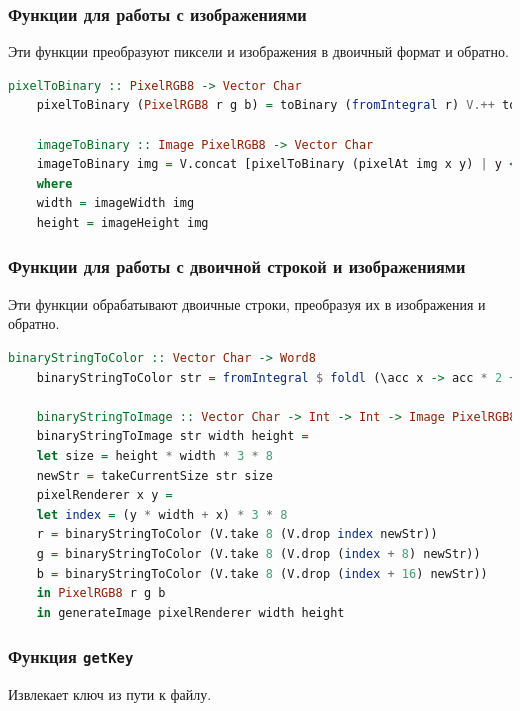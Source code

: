 \documentclass[10pt,a4paper,final]{article} %
\begin{document}
\subsubsection{Функции для работы с изображениями}

Эти функции преобразуют пиксели и изображения в двоичный формат и обратно.

\begin{lstlisting}[language=Haskell, caption=Функции для работы с изображениями]
	pixelToBinary :: PixelRGB8 -> Vector Char
	pixelToBinary (PixelRGB8 r g b) = toBinary (fromIntegral r) V.++ toBinary (fromIntegral g) V.++ toBinary (fromIntegral b) 
	
	imageToBinary :: Image PixelRGB8 -> Vector Char
	imageToBinary img = V.concat [pixelToBinary (pixelAt img x y) | y <- [0..height-1], x <- [0..width-1]]
	where 
	width = imageWidth img
	height = imageHeight img
\end{lstlisting}

\subsubsection{Функции для работы с двоичной строкой и изображениями}

Эти функции обрабатывают двоичные строки, преобразуя их в изображения и обратно.

\begin{lstlisting}[language=Haskell, caption=Функции для работы с двоичными строками и изображениями]
	binaryStringToColor :: Vector Char -> Word8
	binaryStringToColor str = fromIntegral $ foldl (\acc x -> acc * 2 + digitToInt x) 0 str
	
	binaryStringToImage :: Vector Char -> Int -> Int -> Image PixelRGB8
	binaryStringToImage str width height = 
	let size = height * width * 3 * 8
	newStr = takeCurrentSize str size
	pixelRenderer x y =
	let index = (y * width + x) * 3 * 8
	r = binaryStringToColor (V.take 8 (V.drop index newStr))
	g = binaryStringToColor (V.take 8 (V.drop (index + 8) newStr))
	b = binaryStringToColor (V.take 8 (V.drop (index + 16) newStr))
	in PixelRGB8 r g b
	in generateImage pixelRenderer width height
\end{lstlisting}

\subsubsection{Функция \texttt{getKey}}

Извлекает ключ из пути к файлу.
\end{document}
